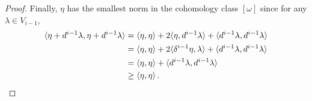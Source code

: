 \documentclass[10pt,a4paper]{amsart}
\begin{document}
\begin{proof}
    Finally, $\eta$ has the smallest norm in the cohomology class $[\omega]$ since for any $\lambda \in V_{i-1}$,
    \begin{align}
        \langle \eta + d^{i-1} \lambda , \eta + d^{i-1} \lambda \rangle &= \langle \eta , \eta \rangle + 2 \langle \eta, d^{i-1} \lambda \rangle + \langle d^{i-1} \lambda , d^{i-1} \lambda \rangle \\
        &= \langle \eta , \eta \rangle + 2 \langle \delta^{i-1} \eta, \lambda \rangle + \langle d^{i-1} \lambda , d^{i-1} \lambda \rangle \nonumber \\
        &= \langle \eta , \eta \rangle + \langle d^{i-1} \lambda , d^{i-1} \lambda \rangle \nonumber \\
        &\geq \langle \eta , \eta \rangle  \, . \qedhere
    \end{align}
\end{proof}
\end{document}
